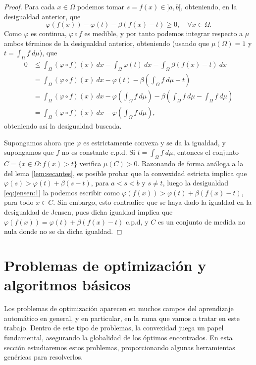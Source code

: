 \begin{proof}
    Para cada $x \in \Omega$ podemos tomar $s = f(x) \in ]a,b[$, obteniendo, en la desigualdad anterior, que
    \begin{equation} \label{eq:jensen:1}
        \varphi(f(x)) - \varphi(t) - \beta(f(x) - t) \ge 0, \quad \forall x \in \Omega.
    \end{equation}
    Como $\varphi$ es continua, $\varphi \circ f$ es medible, y por tanto podemos integrar respecto a $\mu$ ambos términos de la desigualdad anterior, obteniendo (usando que $\mu(\Omega) = 1$ y $t = \int_{\Omega}f\ d\mu$), que
    \begin{align*}
        0 &\le \int_{\Omega}(\varphi \circ f)(x) \ dx - \int_{\Omega} \varphi(t)\ dx - \int_{\Omega}\beta(f(x)-t)\ dx \\
          &= \int_{\Omega}(\varphi \circ f)(x)\ dx - \varphi(t) - \beta\left( \int_{\Omega} f \ d\mu - t\right) \\
          &= \int_{\Omega}(\varphi \circ f)(x)\ dx - \varphi\left( \int_{\Omega}f\ d\mu \right) - \beta\left(\int_{\Omega} f \ d\mu - \int_{\Omega} f \ d\mu\right) \\
          &= \int_{\Omega}(\varphi \circ f)(x)\ dx - \varphi\left( \int_{\Omega}f\ d\mu \right),
    \end{align*}
    obteniendo así la desigualdad buscada.

    Supongamos ahora que $\varphi$ es estrictamente convexa y se da la igualdad, y supongamos que $f$ no es constante c.p.d. Si $t = \int_{\Omega} f \ d\mu$, entonces el conjunto $C = \{x \in \Omega \colon f(x) > t\}$ verifica $\mu(C) > 0$. Razonando de forma análoga a la del lema \ref{lem:secantes}, es posible probar que la convexidad estricta implica que $\varphi(s) > \varphi(t) + \beta(s-t)$, para $a < s < b$ y $s \ne t$, luego la desigualdad \ref{eq:jensen:1} la podemos escribir como $\varphi(f(x)) > \varphi(t) + \beta(f(x) - t)$, para todo $x \in C$. Sin embargo, esto contradice que se haya dado la igualdad en la desigualdad de Jensen, pues dicha igualdad implica que $\varphi(f(x)) = \varphi(t) + \beta(f(x)-t)$ c.p.d, y $C$ es un conjunto de medida no nula donde no se da dicha igualdad.
\end{proof}

\section{Problemas de optimización y algoritmos básicos}

Los problemas de optimización aparecen en muchos campos del aprendizaje automático en general, y en particular, en la rama que vamos a tratar en este trabajo. Dentro de este tipo de problemas, la convexidad juega un papel fundamental, asegurando la globalidad de los óptimos encontrados. En esta sección estudiaremos estos problemas, proporcionando algunas herramientas genéricas para resolverlos.

